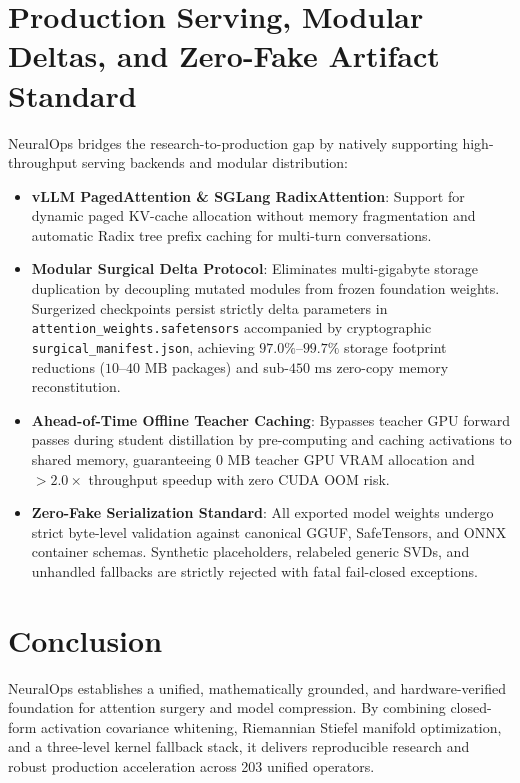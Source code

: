 \documentclass{article}
\begin{document}
\section{Production Serving, Modular Deltas, and Zero-Fake Artifact Standard}
\label{sec:serving}
NeuralOps bridges the research-to-production gap by natively supporting high-throughput serving backends and modular distribution:
\begin{itemize}
    \item \textbf{vLLM PagedAttention \& SGLang RadixAttention}: Support for dynamic paged KV-cache allocation without memory fragmentation and automatic Radix tree prefix caching for multi-turn conversations.
    \item \textbf{Modular Surgical Delta Protocol}: Eliminates multi-gigabyte storage duplication by decoupling mutated modules from frozen foundation weights. Surgerized checkpoints persist strictly delta parameters in \texttt{attention\_weights.safetensors} accompanied by cryptographic \texttt{surgical\_manifest.json}, achieving $97.0\%$--$99.7\%$ storage footprint reductions ($10$--$40\text{ MB}$ packages) and sub-$450\text{ ms}$ zero-copy memory reconstitution.
    \item \textbf{Ahead-of-Time Offline Teacher Caching}: Bypasses teacher GPU forward passes during student distillation by pre-computing and caching activations to shared memory, guaranteeing $0\text{ MB}$ teacher GPU VRAM allocation and $>2.0\times$ throughput speedup with zero CUDA OOM risk.
    \item \textbf{Zero-Fake Serialization Standard}: All exported model weights undergo strict byte-level validation against canonical GGUF, SafeTensors, and ONNX container schemas. Synthetic placeholders, relabeled generic SVDs, and unhandled fallbacks are strictly rejected with fatal fail-closed exceptions.
\end{itemize}

\section{Conclusion}
\label{sec:conclusion}
NeuralOps establishes a unified, mathematically grounded, and hardware-verified foundation for attention surgery and model compression. By combining closed-form activation covariance whitening, Riemannian Stiefel manifold optimization, and a three-level kernel fallback stack, it delivers reproducible research and robust production acceleration across 203 unified operators.
\end{document}
